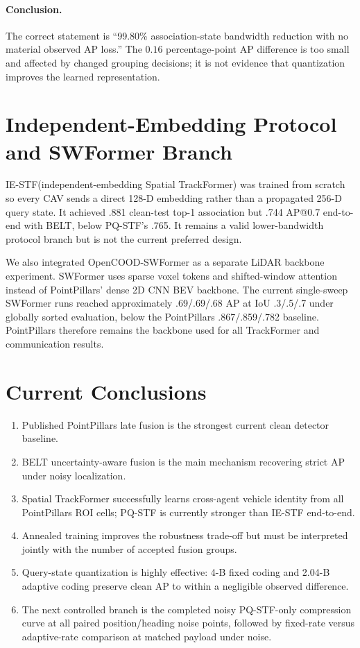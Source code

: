 \documentclass[11pt]{article}
\newcommand{\IESTF}{\textsc{IE-STF}}
\begin{document}
\paragraph{Conclusion.} The correct statement is ``99.80\% association-state bandwidth reduction with no material observed AP loss.'' The $0.16$ percentage-point AP difference is too small and affected by changed grouping decisions; it is not evidence that quantization improves the learned representation.

\clearpage

\section{Independent-Embedding Protocol and SWFormer Branch}

\IESTF (independent-embedding Spatial TrackFormer) was trained from scratch so every CAV sends a direct 128-D embedding rather than a propagated 256-D query state. It achieved .881 clean-test top-1 association but .744 AP@0.7 end-to-end with BELT, below PQ-STF's .765. It remains a valid lower-bandwidth protocol branch but is not the current preferred design.

We also integrated OpenCOOD-SWFormer as a separate LiDAR backbone experiment. SWFormer uses sparse voxel tokens and shifted-window attention instead of PointPillars' dense 2D CNN BEV backbone. The current single-sweep SWFormer runs reached approximately .69/.69/.68 AP at IoU .3/.5/.7 under globally sorted evaluation, below the PointPillars .867/.859/.782 baseline. PointPillars therefore remains the backbone used for all TrackFormer and communication results.

\section{Current Conclusions}

\begin{enumerate}
\item Published PointPillars late fusion is the strongest current clean detector baseline.
\item BELT uncertainty-aware fusion is the main mechanism recovering strict AP under noisy localization.
\item Spatial TrackFormer successfully learns cross-agent vehicle identity from all PointPillars ROI cells; PQ-STF is currently stronger than IE-STF end-to-end.
\item Annealed training improves the robustness trade-off but must be interpreted jointly with the number of accepted fusion groups.
\item Query-state quantization is highly effective: 4-B fixed coding and 2.04-B adaptive coding preserve clean AP to within a negligible observed difference.
\item The next controlled branch is the completed noisy PQ-STF-only compression curve at all paired position/heading noise points, followed by fixed-rate versus adaptive-rate comparison at matched payload under noise.
\end{enumerate}
\end{document}
